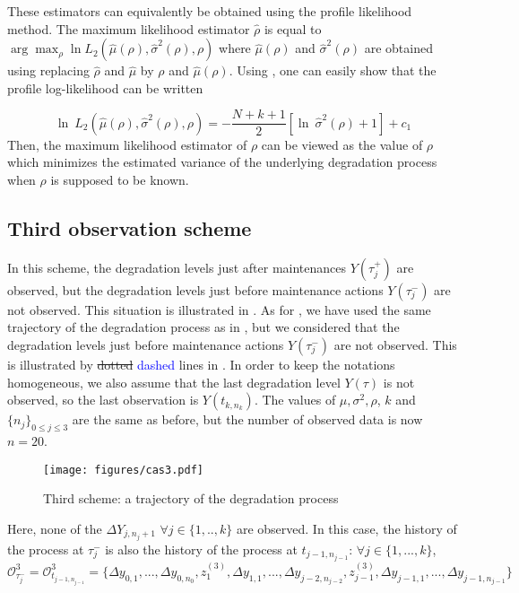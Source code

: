 These estimators can equivalently be obtained using the profile likelihood method. The maximum likelihood estimator $\hat\rho$ is equal to $\arg\max_{\rho} \ln L_2(\hat\mu(\rho),\hat\sigma^2(\rho),\rho)$ where $\hat\mu(\rho)$ and $\hat\sigma^2(\rho)$ are obtained using   replacing $\hat\rho$ and $\hat\mu$ by $\rho$ and $\hat\mu(\rho)$.
Using , one can easily show that the profile log-likelihood can be written 

$$ \ln\ L_2(\hat\mu(\rho),\hat\sigma^2(\rho),\rho)= - \frac{N+k+1}{2} \left[\ln\ \hat\sigma^2 (\rho) +1 \right] +c_1$$
Then, the maximum likelihood estimator of $\rho$ can be viewed as the value of $\rho$ which minimizes the estimated variance of the underlying degradation process when $\rho$ is supposed to be known.

\subsection{Third observation scheme}
\label{3case}

In this scheme, the degradation levels just after maintenances $Y(\tau_j^+)$ are observed, but the degradation levels just before maintenance actions $Y(\tau_j^-)$ are not observed. This situation is illustrated in . As for , we have used the same trajectory of the degradation process as in , but we considered that the degradation levels just before maintenance actions $Y(\tau_j^-)$ are not observed. This is illustrated by \st{dotted} \textcolor{blue}{dashed} lines in . In order to keep the notations homogeneous, we also assume that the last degradation level $Y(\tau)$ is not observed, so the last observation is $Y(t_{k,n_k})$.
The values of $\mu, \sigma^2,\rho$, $k$ and $\{n_j\}_{0 \leq j \leq 3}$ are the same as before, but the number of observed data is now $n=20$.


\begin{figure}[htbp]
\centering
\texttt{[image: figures/cas3.pdf]} 
\caption{Third scheme: a trajectory of the degradation process}
\label{fig:cas3}
\end{figure}

Here, none of the $\Delta Y_{j,n_j+1}$ $\forall j \in \{1,..,k\}$ are observed. In this case, the history of the process at $\tau_j^-$ is also the history of the process at $t_{j-1,n_{j-1}}$:
$\forall j \in \{1,...,k\}$,\\
$\mathcal{O}_{\tau_j^-}^3=\mathcal{O}_{t_{j-1,n_{j-1}}}^3=\{\Delta y_{0,1},...,\Delta y_{0,n_0},z_{1}^{(3)},\Delta y_{1,1},...,\Delta y_{j-2,n_{j-2}},z^{(3)}_{j-1},\Delta y_{j-1,1},...,\Delta y_{j-1,n_{j-1}}\}$

